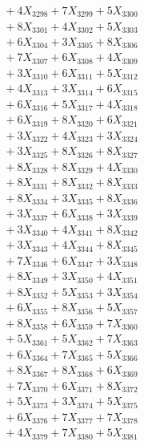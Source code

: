 \documentclass[a4paper,10pt]{article}
\begin{document}
{\begin{align}
&\;  + 4 X_{3298} + 7 X_{3299} + 5 X_{3300} \\[0.3ex]
&\;  + 8 X_{3301} + 4 X_{3302} + 5 X_{3303} \\[0.3ex]
&\;  + 6 X_{3304} + 3 X_{3305} + 8 X_{3306} \\[0.3ex]
&\;  + 7 X_{3307} + 6 X_{3308} + 4 X_{3309} \\[0.5ex]\allowbreak
&\;  + 3 X_{3310} + 6 X_{3311} + 5 X_{3312} \\[0.3ex]
&\;  + 4 X_{3313} + 3 X_{3314} + 6 X_{3315} \\[0.3ex]
&\;  + 6 X_{3316} + 5 X_{3317} + 4 X_{3318} \\[0.3ex]
&\;  + 6 X_{3319} + 8 X_{3320} + 6 X_{3321} \\[0.3ex]
&\;  + 3 X_{3322} + 4 X_{3323} + 3 X_{3324} \\[0.3ex]
&\;  + 3 X_{3325} + 8 X_{3326} + 8 X_{3327} \\[0.3ex]
&\;  + 8 X_{3328} + 8 X_{3329} + 4 X_{3330} \\[0.3ex]
&\;  + 8 X_{3331} + 8 X_{3332} + 8 X_{3333} \\[0.3ex]
&\;  + 8 X_{3334} + 3 X_{3335} + 8 X_{3336} \\[0.3ex]
&\;  + 3 X_{3337} + 6 X_{3338} + 3 X_{3339} \\[0.5ex]\allowbreak
&\;  + 3 X_{3340} + 4 X_{3341} + 8 X_{3342} \\[0.3ex]
&\;  + 3 X_{3343} + 4 X_{3344} + 8 X_{3345} \\[0.3ex]
&\;  + 7 X_{3346} + 6 X_{3347} + 3 X_{3348} \\[0.3ex]
&\;  + 8 X_{3349} + 3 X_{3350} + 4 X_{3351} \\[0.3ex]
&\;  + 8 X_{3352} + 5 X_{3353} + 3 X_{3354} \\[0.3ex]
&\;  + 6 X_{3355} + 8 X_{3356} + 5 X_{3357} \\[0.3ex]
&\;  + 8 X_{3358} + 6 X_{3359} + 7 X_{3360} \\[0.3ex]
&\;  + 5 X_{3361} + 5 X_{3362} + 7 X_{3363} \\[0.3ex]
&\;  + 6 X_{3364} + 7 X_{3365} + 5 X_{3366} \\[0.3ex]
&\;  + 8 X_{3367} + 8 X_{3368} + 6 X_{3369} \\[0.5ex]\allowbreak
&\;  + 7 X_{3370} + 6 X_{3371} + 8 X_{3372} \\[0.3ex]
&\;  + 5 X_{3373} + 3 X_{3374} + 5 X_{3375} \\[0.3ex]
&\;  + 6 X_{3376} + 7 X_{3377} + 7 X_{3378} \\[0.3ex]
&\;  + 4 X_{3379} + 7 X_{3380} + 5 X_{3381} \\[0.3ex]

\end{align}}
\end{document}
